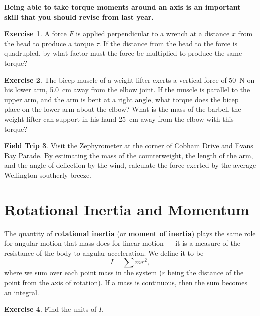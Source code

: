 \documentclass[a4paper]{amsbook}
\theoremstyle{definition}
\newtheorem{exercise}{Exercise}
\numberwithin{exercise}{chapter}
\numberwithin{exercise}{chapter}
\newtheorem{trip}[exercise]{Field Trip}
\begin{document}
\textbf{Being able to take torque moments around an axis is an important skill that you should revise from last year.}

\begin{exercise}
  A force $ F $ is applied perpendicular to a wrench at a distance $ x $ from the head to produce a torque $ \tau $.
  If the distance from the head to the force is quadrupled, by what factor must the force be multiplied to produce the
  same torque?
\end{exercise}

\begin{exercise}
  The bicep muscle of a weight lifter exerts a vertical force of \SI{50}{\newton} on his lower arm, \SI{5.0}{\centi\metre} away from
  the elbow joint. If the muscle is parallel to the upper arm, and the arm is bent at a right angle, what torque does the bicep place
  on the lower arm about the elbow? What is the mass of the barbell the weight lifter can support in his hand \SI{25}{\centi\metre}
  away from the elbow with this torque?
\end{exercise}

\begin{trip}
  Visit the Zephyrometer at the corner of Cobham Drive and Evans Bay Parade. By estimating the mass of the counterweight, the length of
  the arm, and the angle of deflection by the wind, calculate the force exerted by the average Wellington southerly breeze.
\end{trip}

\section{Rotational Inertia and Momentum}
The quantity of \textbf{rotational inertia} (or \textbf{moment of inertia}) plays the same role for angular motion that mass does for
linear motion --- it is a measure of the resistance of the body to angular acceleration. We define it to be
\begin{equation}
  I = \sum mr^2,
\end{equation}
where we sum over each point mass in the system ($ r $ being the distance of the point from the axis of rotation). If
a mass is continuous, then the sum becomes an integral.

\begin{exercise}
  Find the units of $ I $.
\end{exercise}
\end{document}
